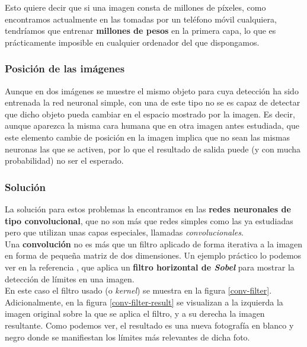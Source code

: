 \documentclass[]{scrartcl}
\begin{document}
			Esto quiere decir que si una imagen consta de millones de píxeles, como encontramos actualmente en las tomadas por un teléfono móvil cualquiera, tendríamos que entrenar \textbf{millones de pesos} en la primera capa, lo que es prácticamente imposible en cualquier ordenador del que dispongamos.
			 
		\subsubsection*{Posición de las imágenes}
		
			Aunque en dos imágenes se muestre el mismo objeto para cuya detección ha sido entrenada la red neuronal simple, con una de este tipo no se es capaz de detectar que dicho objeto pueda cambiar en el espacio mostrado por la imagen. Es decir, aunque aparezca la misma cara humana que en otra imagen antes estudiada, que este elemento cambie de posición en la imagen implica que no sean las mismas neuronas las que se activen, por lo que el resultado de salida puede (y con mucha probabilidad) no ser el esperado.
			
		\subsubsection*{Solución}
		
			La solución para estos problemas la encontramos en las \textbf{redes neuronales de tipo convolucional}, que no son más que redes simples como las ya estudiadas pero que utilizan unas capas especiales, llamadas \textit{convolucionales}.\\
			
			Una \textbf{convolución} no es más que un filtro aplicado de forma iterativa a la imagen en forma de pequeña matriz de dos dimensiones. Un ejemplo práctico lo podemos ver en la referencia \cite{intro-convolutional-nn}, que aplica un \textbf{filtro horizontal de \textit{Sobel}} para mostrar la detección de límites en una imagen.\\
			
			En este caso el filtro usado (o \textit{kernel}) se muestra en la figura \ref{conv-filter}. Adicionalmente, en la figura \ref{conv-filter-result} se visualizan a la izquierda la imagen original sobre la que se aplica el filtro, y a su derecha la imagen resultante. Como podemos ver, el resultado es una nueva fotografía en blanco y negro donde se manifiestan los límites más relevantes de dicha foto.\\
			
\end{document}
